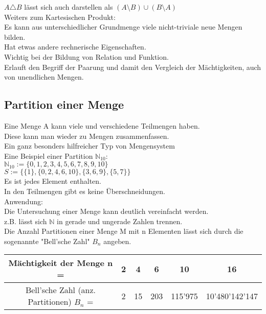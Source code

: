\documentclass[../gruppenarbeit_1.tex]{subfiles}
\begin{document}
$A \triangle B$ lässt sich auch darstellen als $(A \setminus B) \cup (B \setminus A)$\\

Weiters zum Kartesischen Produkt:\\
Es kann aus unterschiedlicher Grundmenge viele nicht-triviale neue Mengen bilden.\\
Hat etwas andere rechnerische Eigenschaften.\\
Wichtig bei der Bildung von Relation und Funktion.\\
Erlauft den Begriff der Paarung und damit den Vergleich der Mächtigkeiten, auch von unendlichen Mengen.\\

\subsection{Partition einer Menge}

Eine Menge A kann viele und verschiedene Teilmengen haben.\\
Diese kann man wieder zu Mengen zusammenfassen.\\
Ein ganz besonders hilfreicher Typ von Mengensystem\\

Eine Beispiel einer Partition $\mathbb{N}_{10}$:\\
$\mathbb{N}_{10} := \{0,1,2,3,4,5,6,7,8,9,10\}$\\
$S := \{\{1\},\{0,2,4,6,10\},\{3,6,9\},\{5,7\}\}$\\
Es ist jedes Element enthalten.\\
In den Teilmengen gibt es keine Überschneidungen.\\

Anwendung:\\
Die Untersuchung einer Menge kann deutlich vereinfacht werden.\\
z.B. lässt sich $\mathbb{N}$ in gerade und ungerade Zahlen trennen.\\

Die Anzahl Partitionen einer Menge M mit n Elementen lässt sich durch die sogenannte "Bell'sche Zahl" $B_n$ angeben.\\

\begin{table}[ht]
    \begin{tabular}{c|c|c|c|c|c}
      Mächtigkeit der Menge n = & 2 & 4 & 6 & 10 & 16 \\ \hline
      Bell'sche Zahl (anz. Partitionen) $B_n$ = & 2 & 15 & 203 & 115'975 & 10'480'142'147 \\
    \end{tabular}
    \quad
\end{table}
\end{document}
